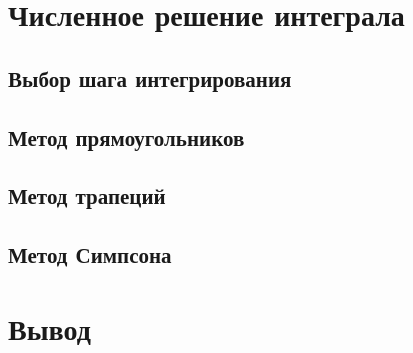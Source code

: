 \documentclass[a4paper,11pt]{article}
\begin{document}
\section{Численное решение интеграла}

\subsection{Выбор шага интегрирования}



\subsection{Метод прямоугольников}

\subsection{Метод трапеций}

\subsection{Метод Симпсона}

\section{Вывод}








\end{document}
